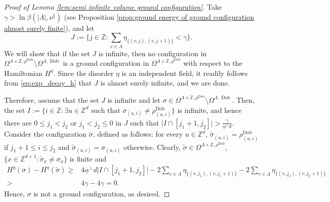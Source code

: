 \documentclass[11pt, reqno]{amsart}
\DeclareMathOperator{\Dob}{Dob}
\numberwithin{equation}{section}
\begin{document}
\begin{proof}[Proof of Lemma \ref{lem:semi infinite volume ground configuration}]
Take $\gamma>\ln\beta(|\Lambda|,\nu^{\parallel})$ (see Proposition \ref{prop:ground energy of ground configuration almost surely finite}), and let $$J:=\{j\in{\mathbb Z} :\sum_{v\in \Lambda} \eta_{\{(v,j),(v,j+1)\}} <\gamma\}.$$
We will show that if the set $J$ is infinite, then no configuration in $\Omega^{\Lambda\times{\mathbb Z},\rho^{\Dob}}\setminus\Omega^{\Lambda,\Dob}$ is a ground configuration in $\Omega^{\Lambda\times{\mathbb Z},\rho^{\Dob}}$ with respect to the Hamiltonian $H^{\eta}$.
Since the disorder $\eta$ is an independent field, it readily follows from \eqref{eq:exp_decay_h} that $J$ is almost surely infinite, and we are done.

Therefore, assume that the set $J$ is infinite and let $\sigma\in\Omega^{\Lambda\times{\mathbb Z},\rho^{\Dob}}\setminus\Omega^{\Lambda,\Dob}$. 
Then, the set $I:=\{i\in{\mathbb Z}\colon\exists u\in{\mathbb Z}^d \text{ such that } \sigma_{(u,i)}\neq\rho^{\Dob}_{(u,i)} \}$ is infinite,
and hence there are $0\leq j_1<j_2$ or $j_1<j_2\leq 0$ in $J$ such that $\lvert I\cap[j_1+1,j_2]\rvert>\frac{\gamma}{ \underline{\alpha}^{\perp}d}$.
Consider the configuration $\tilde{\sigma}$, defined as follows: for every $u\in{\mathbb Z}^d$, $\tilde{\sigma}_{(u,i)}=\rho^{\Dob}_{(u,i)}$ if $j_1+1\leq i\leq j_2$ and $\tilde{\sigma}_{(u,i)}=\sigma_{(u,i)}$ otherwise.
Clearly, $\tilde{\sigma}\in\Omega^{\Lambda\times{\mathbb Z},\rho^{\Dob}}$, $\{x\in{\mathbb Z}^{d+1}\colon\tilde{\sigma}_x\neq\sigma_x\}$ is finite and
\begin{align*}
H^{\eta}(\sigma)-H^{\eta}(\tilde{\sigma})\geq & 4\underline{\alpha}^{\perp}d\lvert I\cap[j_1+1,j_2]\rvert-2\sum_{v\in \Lambda} \eta_{\{(v,j_1),(v,j_1+1)\}} -2\sum_{v\in \Lambda} \eta_{\{(v,j_2),(v,j_2+1)\}} \\
>&4\gamma-4\gamma=0.
\end{align*}
Hence, $\sigma$ is not a ground configuration, as desired. 
\end{proof}
\end{document}

